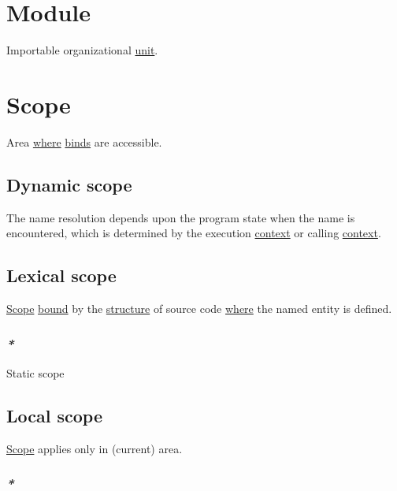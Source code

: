 \documentclass[a4paper,14pt,oneside]{book}
\begin{document}
{\section{\label{org240ade3}Module}
\label{sec:org3ef93a8}
Importable organizational \hyperref[org8df8d1c]{unit}.\\

\section{\label{orgd4e671a}Scope}
\label{sec:orgf282474}
Area \hyperref[org5b6b021]{where} \hyperref[org414b3ae]{binds} are accessible.\\

\subsection{\label{org84aaee0}Dynamic scope}
\label{sec:org6546e74}
The name resolution depends upon the program state when the name is encountered, which is determined by the execution \hyperref[orgae1fb98]{context} or calling \hyperref[orgae1fb98]{context}.\\

\subsection{\label{orga0e6f8f}Lexical scope}
\label{sec:orge6c1243}
\hyperref[orgd4e671a]{Scope} \hyperref[orgda0d3e7]{bound} by the \hyperref[org080800e]{structure} of source code \hyperref[org5b6b021]{where} the named entity is defined.\\

\subsubsection{\emph{*}}
\label{sec:orgbd75717}

\label{org95004f0}Static scope\\

\subsection{\label{orgbdcc84e}Local scope}
\label{sec:orgfb4590b}
\hyperref[orgd4e671a]{Scope} applies only in (current) area.\\

\subsubsection{\emph{*}}
\label{sec:org22dd313}

}
\end{document}
